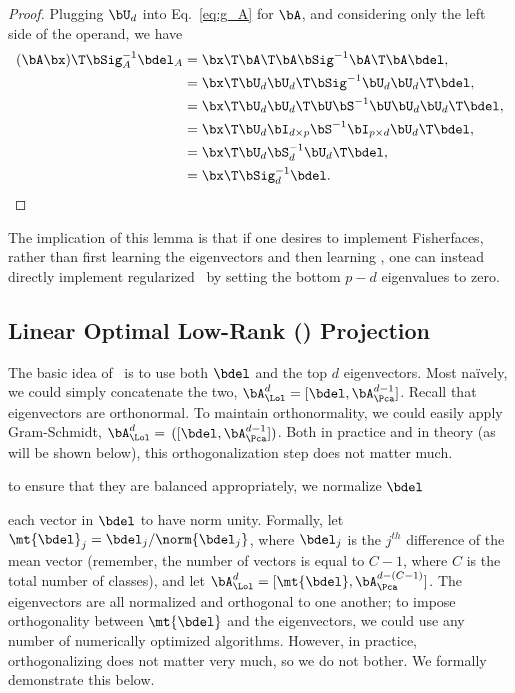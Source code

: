 \documentclass[10pt]{article}
\begin{document}
\begin{proof}
Plugging $\bU_d$ into Eq.~\eqref{eq:g_A} for $\bA$, and considering only the left side of the operand, we have
\begin{align*}
(\bA \bx)\T \bSig^{-1}_A \bdel_A &= \bx\T \bA\T \bA \bSig^{-1} \bA\T \bA \bdel,
\\&= \bx\T  \bU_d\bU_d\T \bSig^{-1} \bU_d\bU_d\T \bdel,
\\&= \bx\T  \bU_d \bU_d\T \bU \bS^{-1} \bU \bU_d\bU_d\T \bdel,
\\&= \bx\T  \bU_d \bI_{d \times p} \bS^{-1} \bI_{p \times d} \bU_d\T \bdel,
\\&= \bx\T  \bU_d \bS^{-1}_d  \bU_d\T \bdel ,
\\&= \bx\T  \bSig^{-1}_d  \bdel.
\end{align*}
\end{proof}

The implication of this lemma is that if one desires to implement Fisherfaces, rather than first learning the eigenvectors and then learning \Lda, one can instead directly implement regularized \Lda~by setting the bottom $p-d$ eigenvalues to zero.




\subsection[LOL]{Linear Optimal Low-Rank (\Lol) Projection}


The basic idea of \Lol~is to use both $\bdel$ and the top $d$ eigenvectors.  Most na\"ively, we could simply concatenate the two, $\bA_{\Lol}^d=[\bdel,\bA_{\Pca}^{d-1}]$.  
Recall that eigenvectors are orthonormal.  To maintain orthonormality, we could easily apply Gram-Schmidt,  $\bA_{\Lol}^d=$ $([\bdel, \bA_{\Pca}^{d-1}])$.
Both in practice and in theory (as will be shown below), this orthogonalization step does not matter much.

to ensure that they are balanced appropriately, we normalize $\bdel$

each vector in $\bdel$ to have norm unity.  Formally, let $\mt{\bdel}_j = \bdel_j / \norm{\bdel_j}$, where $\bdel_j$ is the $j^{th}$ difference of the mean vector (remember, the number of vectors is equal to $C-1$, where $C$ is the total number of classes), and let  $\bA_{\Lol}^d=[\mt{\bdel}, \bA_{\Pca}^{d-(C-1)}]$.  
The eigenvectors are all normalized and orthogonal to one another; to impose orthogonality between $\mt{\bdel}$ and the eigenvectors, we could use any number of numerically optimized algorithms.  However, in practice, orthogonalizing does not matter very much, so we do not bother. We formally demonstrate this below.
\end{document}
